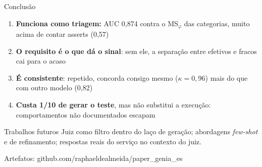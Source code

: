 \documentclass[aspectratio=169,11pt]{beamer}
\newcommand{\msphi}{MS$_\varphi$}
\begin{document}
\begin{frame}{Conclusão}
\begin{enumerate}\setlength\itemsep{0.5em}
  \item \textbf{Funciona como triagem:} AUC 0,874 contra o \msphi{} das categorias, muito acima de contar asserts (0,57)
  \item \textbf{O requisito é o que dá o sinal}: sem ele, a separação entre efetivos e fracos cai para o acaso
  \item \textbf{É consistente}: repetido, concorda consigo mesmo ($\kappa=0{,}96$) mais do que com outro modelo (0,82)
  \item \textbf{Custa 1/10 de gerar o teste}, mas não substitui a execução: comportamentos não documentados escapam
\end{enumerate}
\vspace{0.6em}
\begin{block}{Trabalhos futuros}
Juiz como filtro dentro do laço de geração; abordagens \emph{few-shot} e de refinamento; respostas reais do serviço no contexto do juiz.
\end{block}
\vfill
{\footnotesize Artefatos: github.com/raphaeldealmeida/paper\_genia\_es}
\end{frame}
\end{document}

